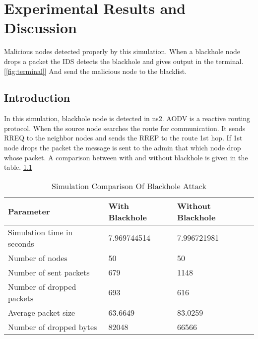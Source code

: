 
\chapter{Experimental Results and Discussion} %

\label{Chapter4} %


Malicious nodes detected properly by this simulation. When a blackhole node drops a packet the IDS detects the blackhole and gives output in the terminal.[\ref{fig:terminal}] And send the malicious node to the blacklist.

\section{Introduction}

In this simulation, blackhole node is detected in ns2. AODV is a reactive routing protocol. When the source node searches the route for communication. It sends RREQ to the neighbor nodes and sends the RREP to the route 1st hop. If 1st node drops the packet the message is sent to the admin that which node drop whose packet. A comparison between with and without blackhole is given in the table. \ref{tab:compare}

\begin{table}[]
	\centering
	\begin{tabular}{|l|l|l|}
		\hline
		\textbf{Parameter}          & \textbf{With Blackhole} & \textbf{Without Blackhole} \\ \hline
		Simulation  time in seconds & 7.969744514             & 7.996721981                \\ \hline
		Number of nodes             & 50                      & 50                         \\ \hline
		Number of sent packets      & 679                     & 1148                       \\ \hline
		Number of dropped packets   & 693                     & 616                        \\ \hline
		Average packet size         & 63.6649                 & 83.0259                    \\ \hline
		Number of dropped bytes     & 82048                   &           66566              \\ \hline
	\end{tabular}
	\caption{Simulation Comparison Of Blackhole Attack}
	\label{tab:compare}
\end{table}

